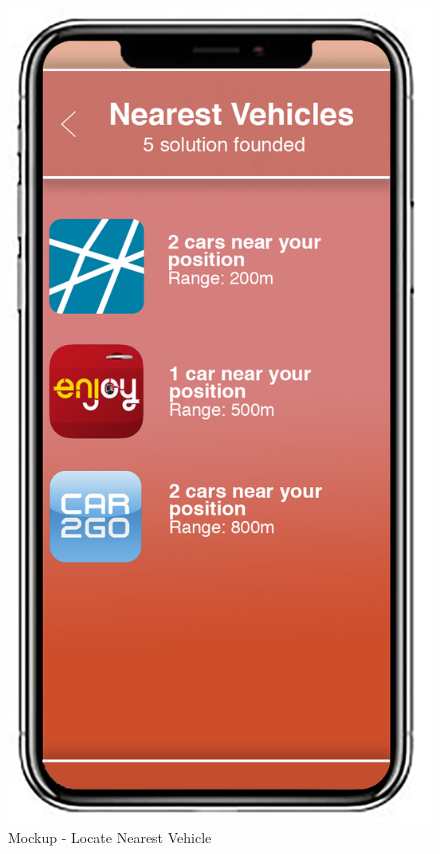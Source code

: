 \begin{figure}[H]	
	\centerline{\includegraphics[width=0.3\paperwidth]{Images/LocateNearestVehicle}}
	\caption{Mockup - Locate Nearest Vehicle}
\end{figure}